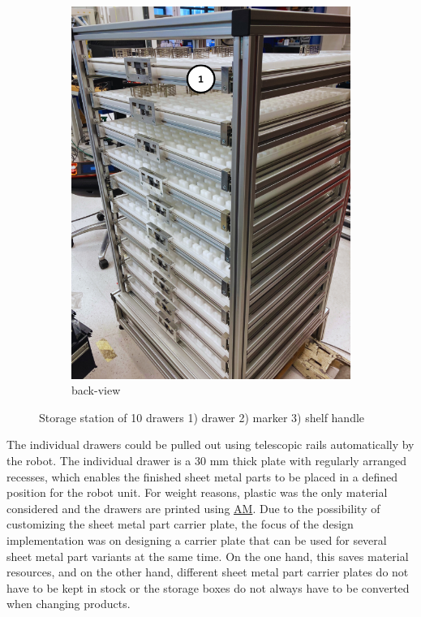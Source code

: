 \begin{figure}[h]
\begin{subfigure}{0.35\textwidth}
        \label{fig:storage-station-front}
    \end{subfigure}\hspace{1cm}
    \begin{subfigure}{0.36\textwidth}
        \centering
        \includegraphics[width=\textwidth]{figures/storage-station-back.png} %
        \caption{back-view}
        \label{fig:storage-station-back}
    \end{subfigure}
    \caption{Storage station of 10 drawers 1) drawer 2) marker 3) shelf handle}
    \label{fig:storage-station-main}
\end{figure}

The individual drawers could be pulled out using
telescopic rails automatically by the robot. 
The individual drawer is a 30 mm thick plate with regularly arranged recesses,
which enables the finished sheet metal parts to be placed in a defined position for the robot unit. For
weight reasons, plastic was the only material considered and the drawers are printed using \hyperref[acro:AM]{AM}.
Due to the possibility of customizing the sheet metal part carrier plate, the
focus of the design implementation was on designing a carrier plate that can be used for several sheet
metal part variants at the same time. On the one hand, this saves material resources, and on the other
hand, different sheet metal part carrier plates do not have to be kept in stock or the storage boxes do
not always have to be converted when changing products.


